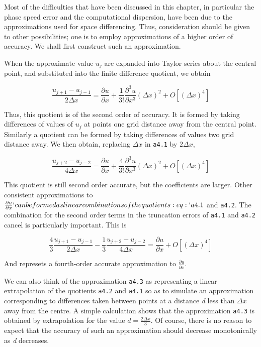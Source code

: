 Most of the difficulties that have been discussed in this chapter, in
particular the phase speed error and the computational dispersion, have
been due to the approximations used for space differencing. Thus,
consideration should be given to other possibilities; one is to employ
approximations of a higher order of accuracy. We shall first construct
such an approximation.

When the approximate value \(u_{j}\) are expanded into Taylor series
about the central point, and substituted into the finite difference
quotient, we obtain

 \[\frac{u_{j + 1} - u_{j - 1}}{2\Delta x} = \frac{\partial u}{\partial x} +
\frac{1}{3!}\frac{\partial^3 u}{\partial x^3}( \Delta x )^{2} +
O\left\lbrack \left( \Delta x \right)^{4} \right\rbrack \]

Thus, this quotient is of the second order of accuracy. It is formed by
taking differences of values of \(u_{j}\) at points one grid distance
away from the central point. Similarly a quotient can be formed by
taking differences of values two grid distance away. We then obtain,
replacing \(\Delta x\) in \texttt{a4.1} by \(2\Delta x\),

\[\frac{u_{j + 2} - u_{j - 2}}{4\Delta x} = \frac{\partial u}{\partial x} +
\frac{4}{3!}\frac{\partial^3 u}{\partial x^3}( \Delta x )^{2} +
O\left\lbrack \left( \Delta x \right)^{4} \right\rbrack\]

This quotient is still second order accurate, but the coefficients are
larger. Other consistent approximations to
\(\frac{\partial u}{\partial x}`can be formed as linear
combinations of the quotients :eq:`a4.1\) and \texttt{a4.2}. The
combination for the second order terms in the truncation errors of
\texttt{a4.1} and \texttt{a4.2} cancel is particularly important. This
is

\[\frac{4}{3}\frac{u_{j+1} - u_{j-1}}{2\Delta x} - \frac{1}{3}\frac{u_{j+2} - u_{j-2}}{4\Delta x}
= \frac{\partial u}{\partial x}
+ O\left\lbrack \left( \Delta x \right)^{4} \right\rbrack\]

And represets a fourth-order accurate approximation to
\(\frac{\partial u}{\partial x}\).

We can also think of the approximation \texttt{a4.3} as representing a
linear extrapolation of the quotients \texttt{a4.2} and \texttt{a4.1} so
as to simulate an approximation corresponding to differences taken
between points at a distance \emph{d} less than \(\Delta x\) away from
the centre. A simple calculation shows that the approximation
\texttt{a4.3} is obtained by extrapolation for the value
\(d = \frac{2\Delta x}{3}\). Of course, there is no reason to expect
that the accuracy of such an approximation should decrease monotonically
as \emph{d} decreases.

